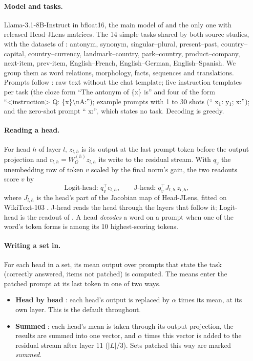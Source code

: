 \documentclass[10pt,a4paper]{article}
\begin{document}
\paragraph{Model and tasks.} Llama-3.1-8B-Instruct in bfloat16, the main model of \citet{yang2026shared} and the only one with released Head-JLens matrices. The 14 simple tasks shared by both source studies, with the datasets of \citet{todd2024function}: antonym, synonym, singular--plural, present--past, country--capital, country--currency, landmark--country, park--country, product--company, next-item, prev-item, English--French, English--German, English--Spanish. We group them as word relations, morphology, facts, sequences and translations. Prompts follow \citet{yang2026shared}: raw text without the chat template; five instruction templates per task (the cloze form ``The antonym of \{x\} is'' and four of the form ``\textless instruction\textgreater{} Q: \{x\}\textbackslash nA:''); example prompts with 1 to 30 shots (`` x$_1$: y$_1$; x:''); and the zero-shot prompt `` x:'', which states no task. Decoding is greedy.

\paragraph{Reading a head.} For head $h$ of layer $l$, $z_{l,h}$ is its output at the last prompt token before the output projection and $c_{l,h}=W_O^{(h)}z_{l,h}$ its write to the residual stream. With $q_v$ the unembedding row of token $v$ scaled by the final norm's gain, the two readouts score $v$ by
\[
\text{Logit-head: } q_v^\top c_{l,h}, \qquad \text{J-head: } q_v^\top J_{l,h}\, z_{l,h},
\]
where $J_{l,h}$ is the head's part of the Jacobian map of Head-JLens, fitted on WikiText-103 \citep{merlo2026headjlens}. J-head reads the head through the layers that follow it; Logit-head is the readout of \citet{yang2026shared}. A head \emph{decodes} a word on a prompt when one of the word's token forms is among its 10 highest-scoring tokens.

\paragraph{Writing a set in.} For each head in a set, its mean output over prompts that state the task (correctly answered, items not patched) is computed. The means enter the patched prompt at its last token in one of two ways.
\begin{itemize}
\item \textbf{Head by head} \citep[Sec.~2.3.2]{yang2026shared}: each head's output is replaced by $\alpha$ times its mean, at its own layer. This is the default throughout.
\item \textbf{Summed} \citep{davidson2025different}: each head's mean is taken through its output projection, the results are summed into one vector, and $\alpha$ times this vector is added to the residual stream after layer 11 ($|L|/3$). Sets patched this way are marked \emph{summed}.
\end{itemize}
\end{document}
